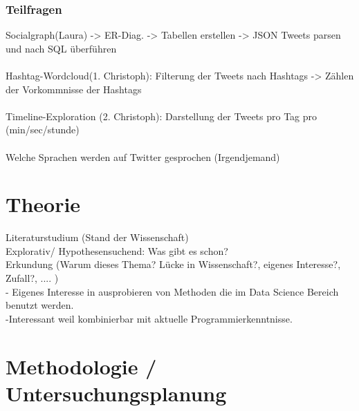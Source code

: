 \documentclass[12pt, 
	a4paper, 
	oneside, 
	leqno]{scrreprt}
\begin{document}


\subsection*{Teilfragen}


Socialgraph(Laura) -> ER-Diag. -> Tabellen erstellen -> JSON Tweets parsen und nach SQL überführen
\\ \\
Hashtag-Wordcloud(1. Christoph): Filterung der Tweets nach Hashtags -> Zählen der Vorkommnisse der Hashtags
\\ \\
Timeline-Exploration (2. Christoph): Darstellung der Tweets pro Tag pro (min/sec/stunde) 
\\ \\ 
Welche Sprachen werden auf Twitter gesprochen (Irgendjemand)

\chapter{Theorie}

Literaturstudium (Stand der Wissenschaft) \\

Explorativ/ Hypothesensuchend: Was gibt es schon? \\

Erkundung (Warum dieses Thema? Lücke in Wissenschaft?, 
eigenes Interesse?, Zufall?, .... ) \\
- Eigenes Interesse in ausprobieren von Methoden die im Data Science Bereich benutzt werden. \\
-Interessant weil kombinierbar mit aktuelle Programmierkenntnisse.

\chapter{Methodologie / Untersuchungsplanung}


\end{document}
